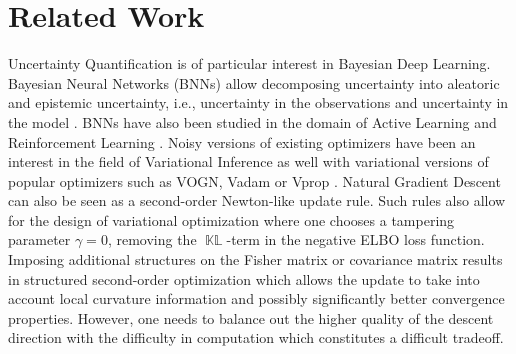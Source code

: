 \documentclass[a4paper, 11pt, oneside]{scrartcl}
\theoremstyle{break}
\DeclareMathOperator{\KL}{\mathbb{KL}}
\numberwithin{equation}{section}
\begin{document}
	\section{Related Work}
		Uncertainty Quantification is of particular interest in Bayesian Deep Learning.
		Bayesian Neural Networks (BNNs) allow decomposing uncertainty into aleatoric and epistemic uncertainty, i.e., uncertainty in the observations and uncertainty in the model \parencite{APH+21, KG17, W22}. 
		BNNs have also been studied in the domain of Active Learning \parencite{DHD+17} and Reinforcement Learning \parencite{KNT+18}.
		Noisy versions of existing optimizers have been an interest in the field of Variational Inference as well with variational versions of popular optimizers such as VOGN, Vadam or Vprop \parencite{KNT+18}.
		Natural Gradient Descent can also be seen as a second-order Newton-like update rule.
		Such rules also allow for the design of variational optimization where one chooses a tampering parameter $\gamma = 0$, removing the $\KL$-term in the negative ELBO loss function. 
		Imposing additional structures on the Fisher matrix or covariance matrix results in structured second-order optimization \parencite{LNK+21} which allows the update to take into account local curvature information and possibly significantly better convergence properties. However, one needs to balance out the higher quality of the descent direction with the difficulty in computation which constitutes a difficult tradeoff.
\end{document}
